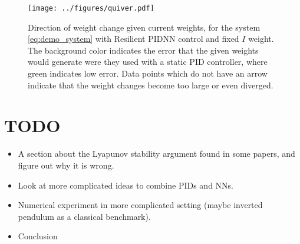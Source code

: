 \documentclass{article}
\begin{document}
    \begin{figure}[tb]
        \centering
        \texttt{[image: ../figures/quiver.pdf]}
        \caption{Direction of weight change given current weights, for the system \eqref{eq:demo_system} with Resilient 
        PIDNN control and fixed $I$ weight. 
        The background color indicates the error that the given weights would generate were they used with a static PID 
        controller, where green indicates low error. Data points which do not have an arrow indicate that the 
        weight changes become too large or even diverged.}
        \label{fig:quiver}
    \end{figure}

    \section{TODO}
    \begin{itemize}
        \item A section about the Lyapunov stability argument found in some papers, and figure out why it is wrong.
                \cite{cong_novel_2005}
        \item Look at more complicated ideas to combine PIDs and NNs. \cite{andrasik_-line_2004,zribi_new_2015}
        \item Numerical experiment in more complicated setting (maybe inverted pendulum as a classical benchmark).
        \item Conclusion
    \end{itemize}


    
     
\end{document}
